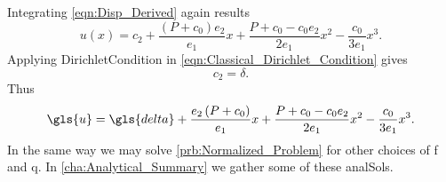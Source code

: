 Integrating \cref{eqn:Disp_Derived} again results
\begin{equation} \label{eqn:Classical_Bar_Double_Integrated}
	u \left( x\right) = c_2 + \frac{\left( P + c_0 \right) e_{2}}{e_{1}}x + \frac{ P + c_0 - c_0 e_2}{2e_{1}}x^{2}
		-\frac{c_{0}}{3e_{1}}x^{3}.
\end{equation}
Applying \gls{DirichletCondition} in \cref{eqn:Classical_Dirichlet_Condition} gives 
\begin{equation*}
	c_{2} = \delta.
\end{equation*}
Thus
\begin{equation}
	\gls{u} = \gls{delta} + \frac{e_{2}\left( P + c_0 \right) }{e_{1}}x + \frac{P + c_0 - c_{0} e_{2}}{2e_{1}}x^{2}
	- \frac{ c_{0} }{ 3e_{1} } x^{3}. \label{eqn:Solution_Classical}
\end{equation}
%
In the same way we may solve \cref{prb:Normalized_Problem} for other choices of
\gls{f} and \gls{q}. In \cref{cha:Analytical_Summary} we gather some of these \glspl{analSol}.
%